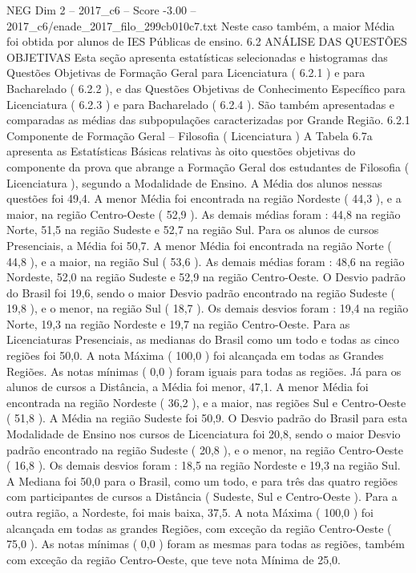 \begin{textsample}{NEG Dim 2 – 2017\_c6 – Score -3.00 – 2017\_c6/enade\_2017\_filo\_299cb010c7.txt}
Neste caso também, a maior Média foi obtida por alunos de IES Públicas de ensino. 6.2 ANÁLISE DAS QUESTÕES OBJETIVAS Esta seção apresenta estatísticas selecionadas e histogramas das Questões Objetivas de Formação Geral para Licenciatura ( 6.2.1 ) e para Bacharelado ( 6.2.2 ), e das Questões Objetivas de Conhecimento Específico para Licenciatura ( 6.2.3 ) e para Bacharelado ( 6.2.4 ).
São também apresentadas e comparadas as médias das subpopulações caracterizadas por Grande Região. 6.2.1 Componente de Formação Geral – Filosofia ( Licenciatura ) A Tabela 6.7a apresenta as Estatísticas Básicas relativas às oito questões objetivas do componente da prova que abrange a Formação Geral dos estudantes de Filosofia ( Licenciatura ), segundo a Modalidade de Ensino.
A Média dos alunos nessas questões foi 49,4.
A menor Média foi encontrada na região Nordeste ( 44,3 ), e a maior, na região Centro-Oeste ( 52,9 ).
As demais médias foram : 44,8 na região Norte, 51,5 na região Sudeste e 52,7 na região Sul.
Para os alunos de cursos Presenciais, a Média foi 50,7.
A menor Média foi encontrada na região Norte ( 44,8 ), e a maior, na região Sul ( 53,6 ).
As demais médias foram : 48,6 na região Nordeste, 52,0 na região Sudeste e 52,9 na região Centro-Oeste.
O Desvio padrão do Brasil foi 19,6, sendo o maior Desvio padrão encontrado na região Sudeste ( 19,8 ), e o menor, na região Sul ( 18,7 ).
Os demais desvios foram : 19,4 na região Norte, 19,3 na região Nordeste e 19,7 na região Centro-Oeste.
Para as Licenciaturas Presenciais, as medianas do Brasil como um todo e todas as cinco regiões foi 50,0.
A nota Máxima ( 100,0 ) foi alcançada em todas as Grandes Regiões.
As notas mínimas ( 0,0 ) foram iguais para todas as regiões.
Já para os alunos de cursos a Distância, a Média foi menor, 47,1.
A menor Média foi encontrada na região Nordeste ( 36,2 ), e a maior, nas regiões Sul e Centro-Oeste ( 51,8 ).
A Média na região Sudeste foi 50,9.
O Desvio padrão do Brasil para esta Modalidade de Ensino nos cursos de Licenciatura foi 20,8, sendo o maior Desvio padrão encontrado na região Sudeste ( 20,8 ), e o menor, na região Centro-Oeste ( 16,8 ).
Os demais desvios foram : 18,5 na região Nordeste e 19,3 na região Sul.
A Mediana foi 50,0 para o Brasil, como um todo, e para três das quatro regiões com participantes de cursos a Distância ( Sudeste, Sul e Centro-Oeste ).
Para a outra região, a Nordeste, foi mais baixa, 37,5.
A nota Máxima ( 100,0 ) foi alcançada em todas as grandes Regiões, com exceção da região Centro-Oeste ( 75,0 ).
As notas mínimas ( 0,0 ) foram as mesmas para todas as regiões, também com exceção da região Centro-Oeste, que teve nota Mínima de 25,0.

\end{textsample}
